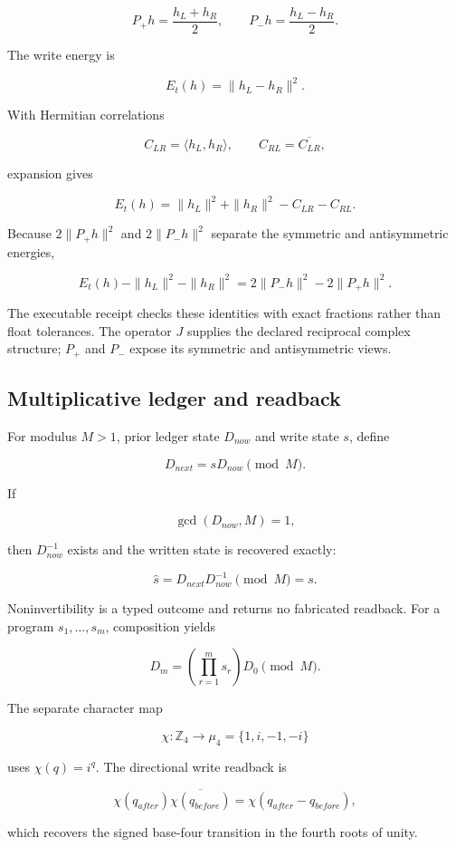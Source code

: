 \[
P_+h=\frac{h_L+h_R}{2},
\qquad
P_-h=\frac{h_L-h_R}{2}.
\]

The write energy is

\[
E_t(h)=\|h_L-h_R\|^2.
\]

With Hermitian correlations

\[
C_{LR}=\langle h_L,h_R\rangle,
\qquad
C_{RL}=\overline{C_{LR}},
\]

expansion gives

\[
E_t(h)=\|h_L\|^2+\|h_R\|^2-C_{LR}-C_{RL}.
\]

Because \(2\|P_+h\|^2\) and \(2\|P_-h\|^2\) separate the symmetric and
antisymmetric energies,

\[
E_t(h)-\|h_L\|^2-\|h_R\|^2
=2\|P_-h\|^2-2\|P_+h\|^2.
\]

The executable receipt checks these identities with exact fractions
rather than float tolerances. The operator \(J\) supplies the declared
reciprocal complex structure; \(P_+\) and \(P_-\) expose its symmetric
and antisymmetric views.

\subsection{Multiplicative ledger and
readback}\label{viii-ch04-multiplicative-ledger-and-readback}

For modulus \(M>1\), prior ledger state \(D_{now}\) and write state
\(s\), define

\[
D_{next}=sD_{now}\pmod M.
\]

If

\[
\gcd(D_{now},M)=1,
\]

then \(D_{now}^{-1}\) exists and the written state is recovered exactly:

\[
\widehat s=D_{next}D_{now}^{-1}\pmod M=s.
\]

Noninvertibility is a typed outcome and returns no fabricated readback.
For a program \(s_1,\ldots,s_m\), composition yields

\[
D_m=\left(\prod_{r=1}^ms_r\right)D_0\pmod M.
\]

The separate character map

\[
\chi:\mathbb Z_4\to\mu_4=\{1,i,-1,-i\}
\]

uses \(\chi(q)=i^q\). The directional write readback is

\[
\chi(q_{after})\overline{\chi(q_{before})}
=\chi(q_{after}-q_{before}),
\]

which recovers the signed base-four transition in the fourth roots of
unity.


